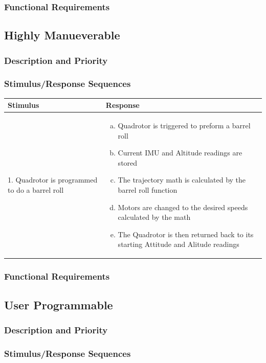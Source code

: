 \documentclass[english]{article}
\numberwithin{equation}{section} %
\begin{document}
\subsubsection{Functional Requirements}
\bigskip
\subsection{Highly Manueverable}
\subsubsection{Description and Priority}
\subsubsection{Stimulus/Response Sequences}

\begin{longtable}{p{3cm} | p{10cm}}
\hline
\textbf{Stimulus} & \textbf{Response}\\
\hline
1. Quadrotor is programmed to do a barrel roll &
\begin{enumerate}[(a)]\itemsep1pt %
\item Quadrotor is triggered to preform a barrel roll
\item Current IMU and Altitude readings are stored
\item The trajectory math is calculated by the barrel roll function
\item Motors are changed to the desired speeds calculated by the math
\item The Quadrotor is then returned back to its starting Attitude and Alitude readings
\end{enumerate}
\\ 
\hline
\end{longtable}



\subsubsection{Functional Requirements}
\bigskip
\subsection{User Programmable}
\subsubsection{Description and Priority}
\subsubsection{Stimulus/Response Sequences}
\end{document}
